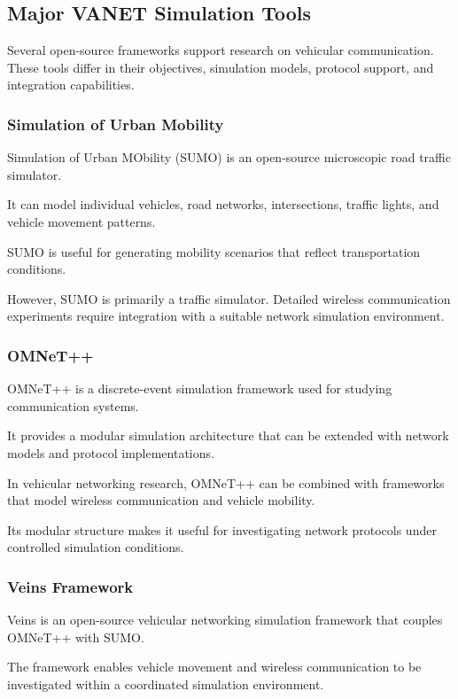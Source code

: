 \subsection{Major VANET Simulation Tools}
\label{sec:4B}

Several open-source frameworks support
research on vehicular communication.
These tools differ in their objectives,
simulation models, protocol support,
and integration capabilities.

\subsubsection{Simulation of Urban Mobility}

Simulation of Urban MObility (SUMO)
is an open-source microscopic road
traffic simulator.

It can model individual vehicles,
road networks, intersections,
traffic lights, and vehicle
movement patterns.

SUMO is useful for generating
mobility scenarios that reflect
transportation conditions.

However, SUMO is primarily a
traffic simulator. Detailed wireless
communication experiments require
integration with a suitable
network simulation environment.

\subsubsection{OMNeT++}

OMNeT++ is a discrete-event
simulation framework used for
studying communication systems.

It provides a modular simulation
architecture that can be extended
with network models and protocol
implementations.

In vehicular networking research,
OMNeT++ can be combined with
frameworks that model wireless
communication and vehicle mobility.

Its modular structure makes it
useful for investigating network
protocols under controlled
simulation conditions.

\subsubsection{Veins Framework}

Veins is an open-source vehicular
networking simulation framework
that couples OMNeT++ with SUMO.

The framework enables vehicle
movement and wireless communication
to be investigated within a
coordinated simulation environment.

